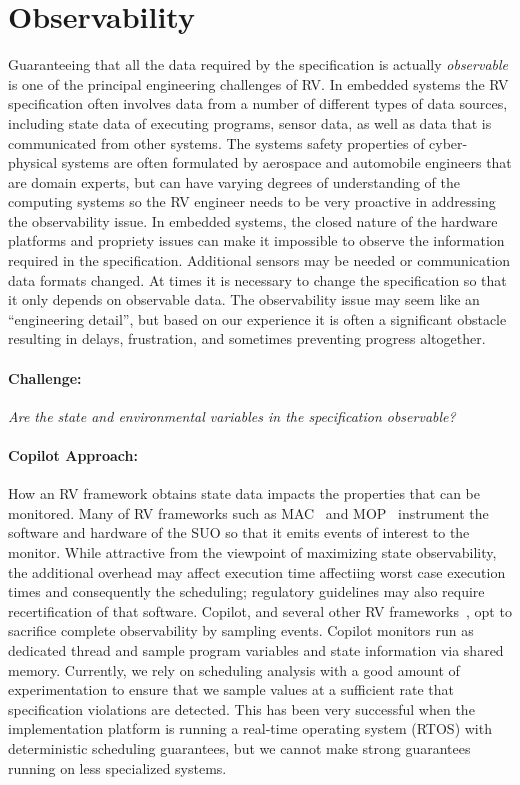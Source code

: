 \section{Observability}\label{sec:observ} 
Guaranteeing that all the data required by the specification is
actually \emph{observable} is one of the principal engineering
challenges of RV. In embedded systems the RV specification often
involves data from a number of different types of data sources,
including state data of executing programs, sensor data, as well as
data that is communicated from other systems.  The systems safety
properties of cyber-physical systems are often formulated by aerospace
and automobile engineers that are domain experts, but can have
varying degrees of understanding of the computing systems so the RV
engineer needs to be very proactive in addressing the observability
issue. In embedded systems, the closed nature of the hardware
platforms and propriety issues can make it impossible to observe the
information required in the specification.  Additional sensors may be
needed or communication data formats changed.  At times it is
necessary to change the specification so that it only depends on
observable data.  The observability issue may seem like an
``engineering detail'', but based on our experience it is often a
significant obstacle resulting in  delays, frustration, and sometimes
preventing progress altogether.


\paragraph{Challenge:} \emph{Are the state and environmental variables in the
specification  observable?}  


  \paragraph{Copilot Approach:} How an RV framework obtains state data impacts the properties that
  can be monitored. Many of RV frameworks such as MAC~\cite{KimLKS04}
  and MOP~\cite{ChenR05} instrument the software and hardware of the
  SUO so that it emits events of interest to the monitor.  While
  attractive from the viewpoint of maximizing state observability, the
  additional overhead may affect execution time affectiing worst case
  execution times and consequently the scheduling; 
  regulatory guidelines may  also require recertification of that software.
  Copilot, and several other RV frameworks~\cite{sampling,Kane15,borzoo}, opt to sacrifice complete
  observability by sampling events.  Copilot monitors run as dedicated
  thread and sample program variables and state information via shared
  memory.  Currently, we rely on scheduling analysis with a good
  amount of experimentation to ensure that we sample values at a
  sufficient rate that specification violations are detected. This has
  been very successful when the implementation platform is running a
  real-time operating system (RTOS) with deterministic scheduling
  guarantees, but we cannot make strong guarantees running on less
  specialized systems.

